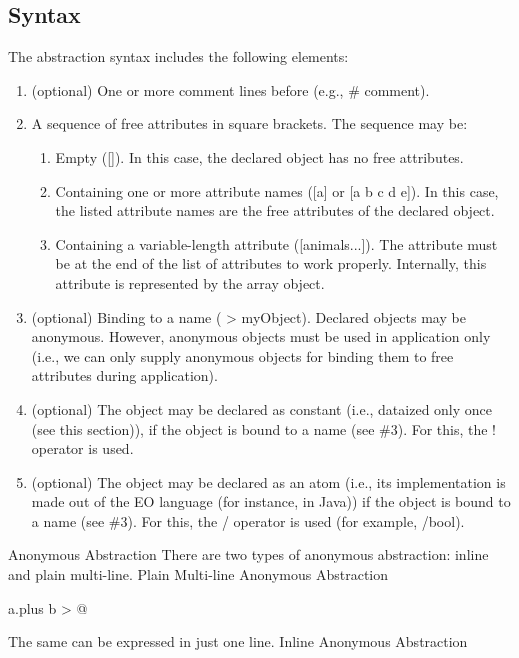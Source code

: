 \documentclass[12pt]{book}
\begin{document}
\subsection{Syntax}
The abstraction syntax includes the following elements:

\begin{enumerate}
    \item (optional) One or more comment lines before (e.g., \# comment).
    \item A sequence of free attributes in square brackets. The sequence may be:
    \begin{enumerate}
        \item Empty ([]). In this case, the declared object has no free attributes.
        \item Containing one or more attribute names ([a] or [a b c d e]). In this case, the listed attribute names are the free attributes of the declared object.
        \item Containing a variable-length attribute ([animals...]). The attribute must be at the end of the list of attributes to work properly. Internally, this attribute is represented by the array object.
    \end{enumerate}
    \item (optional) Binding to a name ( > myObject). Declared objects may be anonymous. However, anonymous objects must be used in application only (i.e., we can only supply anonymous objects for binding them to free attributes during application).
    \item (optional) The object may be declared as constant (i.e., dataized only once (see this section)), if the object is bound to a name (see \#3). For this, the ! operator is used.
    \item (optional) The object may be declared as an atom (i.e., its implementation is made out of the EO language (for instance, in Java)) if the object is bound to a name (see \#3). For this, the / operator is used (for example, /bool).
\end{enumerate}
Anonymous Abstraction
There are two types of anonymous abstraction: inline and plain multi-line.
Plain Multi-line Anonymous Abstraction

\begin{ffcode}
[a b]
  a.plus b > @
\end{ffcode}

The same can be expressed in just one line.
Inline Anonymous Abstraction
\end{document}
